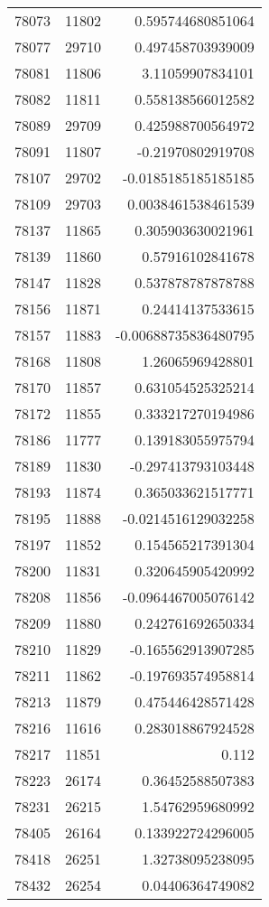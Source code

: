 \begin{tabular}{r | r | r}
78073 & 11802 & 0.595744680851064 \\
78077 & 29710 & 0.497458703939009 \\
78081 & 11806 & 3.11059907834101 \\
78082 & 11811 & 0.558138566012582 \\
78089 & 29709 & 0.425988700564972 \\
78091 & 11807 & -0.21970802919708 \\
78107 & 29702 & -0.0185185185185185 \\
78109 & 29703 & 0.0038461538461539 \\
78137 & 11865 & 0.305903630021961 \\
78139 & 11860 & 0.57916102841678 \\
78147 & 11828 & 0.537878787878788 \\
78156 & 11871 & 0.24414137533615 \\
78157 & 11883 & -0.00688735836480795 \\
78168 & 11808 & 1.26065969428801 \\
78170 & 11857 & 0.631054525325214 \\
78172 & 11855 & 0.333217270194986 \\
78186 & 11777 & 0.139183055975794 \\
78189 & 11830 & -0.297413793103448 \\
78193 & 11874 & 0.365033621517771 \\
78195 & 11888 & -0.0214516129032258 \\
78197 & 11852 & 0.154565217391304 \\
78200 & 11831 & 0.320645905420992 \\
78208 & 11856 & -0.0964467005076142 \\
78209 & 11880 & 0.242761692650334 \\
78210 & 11829 & -0.165562913907285 \\
78211 & 11862 & -0.197693574958814 \\
78213 & 11879 & 0.475446428571428 \\
78216 & 11616 & 0.283018867924528 \\
78217 & 11851 & 0.112 \\
78223 & 26174 & 0.36452588507383 \\
78231 & 26215 & 1.54762959680992 \\
78405 & 26164 & 0.133922724296005 \\
78418 & 26251 & 1.32738095238095 \\
78432 & 26254 & 0.04406364749082 \\

\end{tabular}
